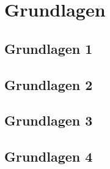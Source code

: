 \section{Grundlagen}\label{grundlagen}
	\subsection{Grundlagen 1}
	\blindtext[10]	
	\subsection{Grundlagen 2}
	\blindtext[10]	
	\subsection{Grundlagen 3}
	\blindtext[10]	
	\subsection{Grundlagen 4}
	\blindtext[10]	
